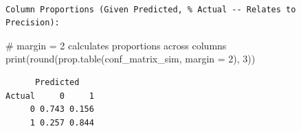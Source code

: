 \documentclass[
  letterpaper,
]{scrbook}
\newenvironment{Shaded}{\begin{snugshade}}{\end{snugshade}}
\newcommand{\AttributeTok}[1]{\textcolor[rgb]{0.40,0.45,0.13}{#1}}
\newcommand{\CommentTok}[1]{\textcolor[rgb]{0.37,0.37,0.37}{#1}}
\newcommand{\DecValTok}[1]{\textcolor[rgb]{0.68,0.00,0.00}{#1}}
\newcommand{\FunctionTok}[1]{\textcolor[rgb]{0.28,0.35,0.67}{#1}}
\newcommand{\NormalTok}[1]{\textcolor[rgb]{0.00,0.23,0.31}{#1}}
\begin{document}
\begin{verbatim}

Column Proportions (Given Predicted, % Actual -- Relates to Precision):
\end{verbatim}

\begin{Shaded}
\begin{Highlighting}[]
\CommentTok{\# margin = 2 calculates proportions across columns}
\FunctionTok{print}\NormalTok{(}\FunctionTok{round}\NormalTok{(}\FunctionTok{prop.table}\NormalTok{(conf\_matrix\_sim, }\AttributeTok{margin =} \DecValTok{2}\NormalTok{), }\DecValTok{3}\NormalTok{))}
\end{Highlighting}
\end{Shaded}

\begin{verbatim}
      Predicted
Actual     0     1
     0 0.743 0.156
     1 0.257 0.844
\end{verbatim}
\end{document}
